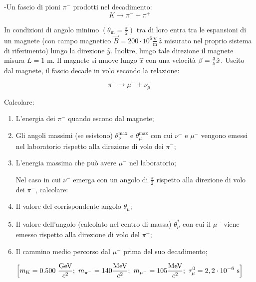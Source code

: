 \documentclass[12pt,twoside,a4]{article}
\begin{document}
\begin{esercizio}
	-Un fascio di pioni $\pi^-$ prodotti nel decadimento:
	\begin{equation*}
		K \rightarrow \pi^- + \pi^+
	\end{equation*}

In condizioni di angolo minimo $\left(\theta_\mathrm{m} = \frac{\pi}{2} \right)$  tra di loro entra tra le espansioni di un magnete (con campo magnetico $\vec{B} = 200 \cdot 10^6 \frac{\mathrm{V}}{\mathrm{m}} \, \hat{z}$ misurato nel proprio sistema di riferimento) lungo la direzione $\hat{y}$. Inoltre, lungo tale direzione il magnete misura $L = 1$ m. Il magnete si muove lungo $\hat{x}$ con una velocità $\vec{$\beta$} = \frac{3}{5} \hat{x}$. 
   Uscito dal magnete, il fascio decade in volo secondo la relazione: 

\begin{equation*}
		\pi^- \rightarrow \mu^- + \nu^-_\mu
\end{equation*}

Calcolare:
\begin{enumerate}[label=(\textit{\roman*})]
	\item L'energia dei $\pi^-$ quando escono dal magnete;
	\item Gli angoli massimi (se esistono) $\theta^\mathrm{max}_\nu$ e $\theta^\mathrm{max}_\mu$ con cui $\nu^-$ e $\mu^-$ vengono emessi nel laboratorio rispetto alla direzione di volo dei $\pi^-$;
	\item L'energia massima che può avere $\mu^-$ nel laboratorio; 

Nel caso in cui $\nu^-$ emerga con un angolo di $\frac{\pi}{2}$ rispetto alla direzione di volo dei $\pi^-$, calcolare: 

	\item Il valore del corrispondente angolo $\theta_\mu$;
	\item Il valore dell'angolo (calcolato nel centro di massa) $\theta^\ast_\mu$ con cui il $\mu^-$ viene emesso rispetto alla direzione di volo del $\pi^-$;
	\item Il cammino medio percorso dal $\mu^-$ prima del suo decadimento; 
\end{enumerate}

\begin{equation*}
	\Big[ m_\mathrm{K} = 0.500 \ \frac{\mathrm{GeV}}{c^2}; \ m_{\pi^-}=140 \frac{\mev}{c^2}; \ m_{\mu^-} = 105 \frac{\mev}{c^2}; \ \tau_\mu^0 = 2,2 \cdot 10^{-6} \ \mathrm{s} \Big] 
\end{equation*}
\end{esercizio}
\end{document}
